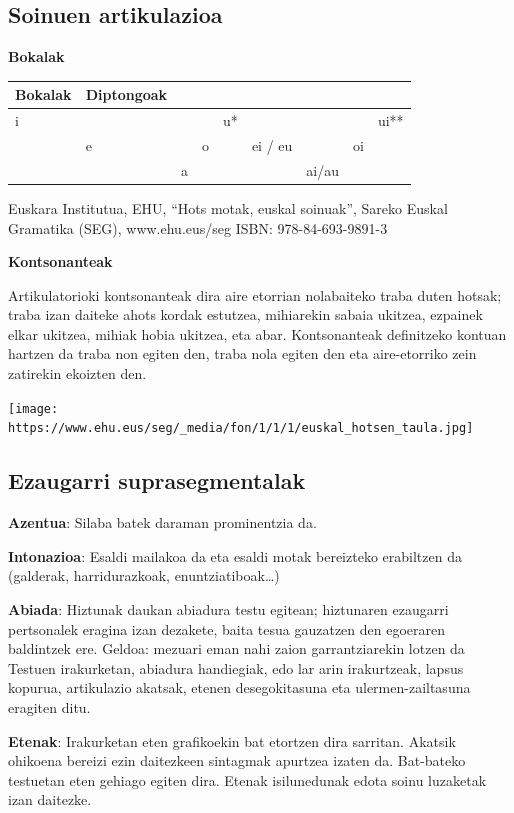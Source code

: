 \documentclass[
]{book}
\begin{document}
\hypertarget{soinuen-artikulazioa}{%
\subsection{Soinuen artikulazioa}\label{soinuen-artikulazioa}}

\textbf{Bokalak}

\begin{longtable}[]{@{}lllllllll@{}}
\toprule
\textbf{Bokalak} & \textbf{Diptongoak} & & & & & & &\tabularnewline
\midrule
\endhead
i & & & & u* & & & & ui**\tabularnewline
& e & & o & & ei / eu & & oi &\tabularnewline
& & a & & & & ai/au & &\tabularnewline
\bottomrule
\end{longtable}

Euskara Institutua, EHU, ``Hots motak, euskal soinuak'', Sareko Euskal Gramatika (SEG), www.ehu.eus/seg
ISBN: 978-84-693-9891-3

\textbf{Kontsonanteak}

Artikulatorioki kontsonanteak dira aire etorrian nolabaiteko traba duten hotsak; traba izan daiteke ahots kordak estutzea, mihiarekin sabaia ukitzea, ezpainek elkar ukitzea, mihiak hobia ukitzea, eta abar. Kontsonanteak definitzeko kontuan hartzen da traba non egiten den, traba nola egiten den eta aire-etorriko zein zatirekin ekoizten den.

\texttt{[image: https://www.ehu.eus/seg/\_media/fon/1/1/1/euskal\_hotsen\_taula.jpg]}

\hypertarget{ezaugarri-suprasegmentalak}{%
\subsection{Ezaugarri suprasegmentalak}\label{ezaugarri-suprasegmentalak}}

\textbf{Azentua}: Silaba batek daraman prominentzia da.

\textbf{Intonazioa}: Esaldi mailakoa da eta esaldi motak bereizteko erabiltzen da (galderak, harridurazkoak, enuntziatiboak\ldots)

\textbf{Abiada}: Hiztunak daukan abiadura testu egitean; hiztunaren ezaugarri pertsonalek eragina izan dezakete, baita tesua gauzatzen den egoeraren baldintzek ere.
Geldoa: mezuari eman nahi zaion garrantziarekin lotzen da
Testuen irakurketan, abiadura handiegiak, edo lar arin irakurtzeak, lapsus kopurua, artikulazio akatsak, etenen desegokitasuna eta ulermen-zailtasuna eragiten ditu.

\textbf{Etenak}: Irakurketan eten grafikoekin bat etortzen dira sarritan.
Akatsik ohikoena bereizi ezin daitezkeen sintagmak apurtzea izaten da.
Bat-bateko testuetan eten gehiago egiten dira.
Etenak isilunedunak edota soinu luzaketak izan daitezke.
\end{document}

